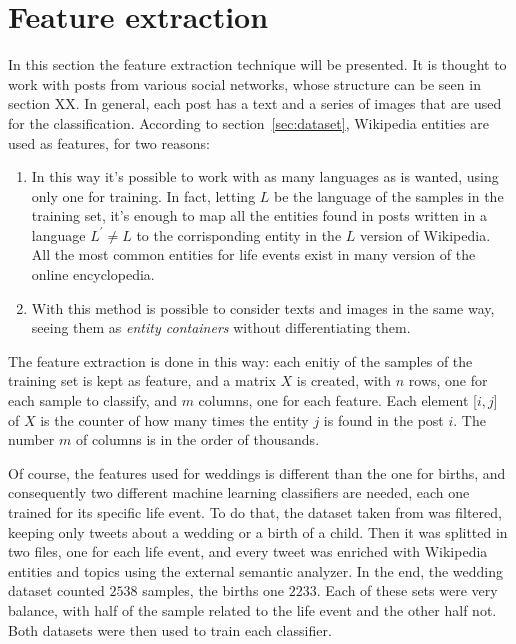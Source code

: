 \section{Feature extraction}
\label{sec:featurextraction}
In this section the feature extraction technique will be presented. It is thought to work with posts from various social networks, whose structure can be seen in section XX. In general, each post has a text and a series of images that are used for the classification. According to section~\ref{sec:dataset}, Wikipedia entities are used as features, for two reasons:
\begin{enumerate}
\item In this way it's possible to work with as many languages as is wanted, using only one for training. In fact, letting $ L $ be the language of the samples in the training set, it's enough to map all the entities found in posts written in a language $ L^{'} \ne L $ to the corrisponding entity in the $ L $ version of Wikipedia. All the most common entities for life events exist in many version of the online encyclopedia.
\item With this method is possible to consider texts and images in the same way, seeing them as \textit{entity containers} without differentiating them.
\end{enumerate}

The feature extraction is done in this way: each enitiy of the samples of the training set is kept as feature, and a matrix $X$ is created, with $n$ rows, one for each sample to classify, and $m$ columns, one for each feature. Each element [$i,j$] of $X$ is the counter of how many times the entity $j$ is found in the post $i$. The number $m$ of columns is in the order of thousands.

Of course, the features used for weddings is different than the one for births, and consequently two different machine learning classifiers are needed, each one trained for its specific life event. To do that, the dataset taken from \cite{dickinson2015identifying} was filtered, keeping only tweets about a wedding or a birth of a child. Then it was splitted in two files, one for each life event, and every tweet was enriched with Wikipedia entities and topics using the external semantic analyzer. In the end, the wedding dataset counted $2538$ samples, the births one $2233$. Each of these sets were very balance, with half of the sample related to the life event and the other half not. Both datasets were then used to train each classifier.

